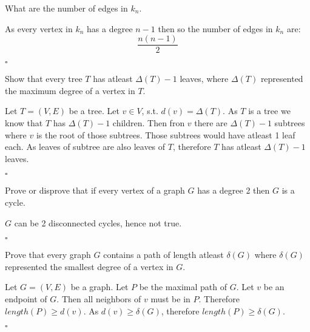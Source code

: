 \documentclass{exam}
\begin{document}
\begin{questions}
    \question What are the number of edges in $k_n$.
    \begin{solution}
        As every vertex in $k_n$ has a degree $n-1$ then so the number of edges in $k_n$ are:
        $$\frac{n(n-1)}{2}$$

        \begin{flushright}
            $\square$
        \end{flushright}
    \end{solution}

    \question Show that every tree $T$ has atleast $\Delta(T)-1$ leaves, where $\Delta(T)$ represented the maximum degree of a vertex in $T$.
    \begin{solution}
        Let $T = (V,E)$ be a tree. Let $v \in V$, s.t. $d(v) = \Delta(T)$. As $T$ is a tree we know that $T$ has $\Delta(T)-1$ children.
        Then fron $v$ there are $\Delta(T)-1$ subtrees where $v$ is the root of those subtrees. Those subtrees would have atleast 1 leaf each. 
        As leaves of subtree are also leaves of $T$, therefore $T$ has atleast $\Delta(T)-1$ leaves.
        \begin{flushright}
            $\square$
        \end{flushright}
    \end{solution}

    \question Prove or disprove that if every vertex of a graph $G$ has a degree 2 then $G$ is a cycle.
    \begin{solution}
        $G$ can be 2 disconnected cycles, hence not true.
        \begin{flushright}
            $\square$
        \end{flushright}
    \end{solution}


    \question Prove that every graph $G$ contains a path of length atleast $\delta(G)$ where $\delta(G)$ represented the smallest degree of a vertex in $G$.
    \begin{solution}
        Let $G = (V,E)$ be a graph. Let $P$ be the maximal path of $G$. Let $v$ be an endpoint of $G$. Then all neighbors of $v$ must be in $P$.
        Therefore $length(P)\geq d(v)$. As $d(v) \geq \delta(G)$, therefore $length(P)\geq \delta(G)$.
        \begin{flushright}
            $\square$
        \end{flushright}
    \end{solution}


\end{questions}
\end{document}
